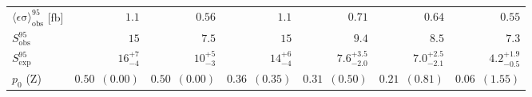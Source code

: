 \begin{table}[H]
\begin{center}
\begin{tabular}{|lrrrrrr|}
$\langle\epsilon\mathrm{ \sigma}\rangle_\mathrm{ obs}^{95}$ [fb]   & $1.1$   &  $0.56$  &  $1.1$ & $0.71$ & $0.64$ &  $0.55$ \\
$S_\mathrm{ obs}^{95}$     & $15$ & $7.5$ &$15$ & $9.4$ & $8.5$  &  $7.3$ \\
$S_\mathrm{ exp}^{95}$     & $ { 16 }^{ +7 }_{ -4 }$  & $ { 10 }^{ +5 }_{ -3 }$ & $ { 14 }^{ +6 }_{ -4 }$ & $ { 7.6 }^{ +3.5}_{ -2.0 }$ & $ { 7.0 }^{ +2.5}_{ -2.1 }$  & $ { 4.2 }^{ +1.9 }_{ -0.5 }$\\
$p_{0}$ ($\mathrm{Z}$)        & $ 0.50$~$(0.00)$  & $ 0.50$~$(0.00)$ & $ 0.36$~$(0.35)$ & $ 0.31$~$(0.50)$ & $ 0.21$~$(0.81)$ & $ 0.06$~$(1.55)$ \\
\hline
\end{tabular}





\end{center}
\end{table}

